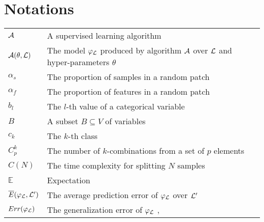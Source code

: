 
\chapter{Notations}

\begin{tabularx}{\textwidth}{ l X }
${\cal A}$ & A supervised learning algorithm \dotfill  \pageref{ntn:A}\\
${\cal A}(\theta, {\cal L})$ & The model $\varphi_{\cal L}$ produced by algorithm ${\cal A}$ over ${\cal L}$ and hyper-parameters $\theta$ \dotfill  \pageref{ntn:A-func}\\
$\alpha_s$ & The proportion of samples in a random patch \dotfill  \pageref{ntn:alpha_s}\\
$\alpha_f$ & The proportion of features in a random patch \dotfill  \pageref{ntn:alpha_f}\\
$b_l$ & The $l$-th value of a categorical variable \dotfill  \pageref{ntn:b_l}\\
$B$ & A subset $B \subseteq V$ of variables \dotfill  \pageref{ntn:B}\\
$c_k$ & The $k$-th class \dotfill  \pageref{ntn:c_k}\\
$C^k_p$ & The number of $k$-combinations from a set of $p$ elements \dotfill  \pageref{ntn:C_k_p}\\
$C(N)$ & The time complexity for splitting $N$ samples \dotfill  \pageref{ntn:cN}\\
$\mathbb{E}$ & Expectation \dotfill \\
$\overline{E}(\varphi_{\cal L}, {\cal L}^\prime)$ & The average prediction error of $\varphi_{\cal L}$ over ${\cal L}^\prime$ \dotfill  \pageref{ntn:E_bar}\\
$Err(\varphi_{\cal L})$ & The generalization error of $\varphi_{\cal L}$ \dotfill  \pageref{eqn:generalization-error}, \pageref{eqn:4:generalization-error}\\

\end{tabularx}
